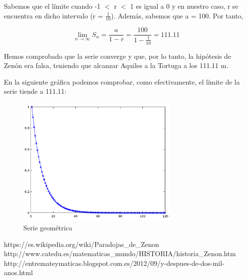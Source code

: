 \documentclass[a4paper,12pt]{article}
\begin{document}
   Sabemos que el límite cuando -1 $<$ r $<$ 1 es igual a 0 y en nuestro caso, r se encuentra en
   dicho intervalo (r = $\frac{1}{10}$). Además, sabemos que a = 100. Por tanto, 
   
   \begin{equation}
   \lim\limits_{n \rightarrow \infty} S_n = \frac{a}{1 - r} = \frac{100}{1 - \frac{1}{10}} = 111.11
   \end{equation}
   
   Hemos comprobado que la serie converge y que, por lo tanto, la hipótesis de Zenón era falsa,
   teniendo que alcanzar Aquiles a la Tortuga a los 111.11 m.
   
   En la siguiente gráfica podemos comprobar, como efectivamente, 
   el límite de la serie tiende a 111.11: \newline
   
   \begin{figure}[h]
   \begin{center}
   \includegraphics[width=8cm]{Octave/SucesionAquilesyTortuga.png}
   \end{center}
   \caption{Serie geométrica}
   \label{fig:aquiles2}
   \end{figure} 
      
   \newpage
   
   \begin{thebibliography}{99}
   
       https://es.wikipedia.org/wiki/Paradojas\_de\_Zenon
       http://www.catedu.es/matematicas\_mundo/HISTORIA/historia\_Zenon.htm
      http://entremateymaticas.blogspot.com.es/2012/09/y-despues-de-dos-mil-anos.html
      
   \end{thebibliography}
  
\end{document}

